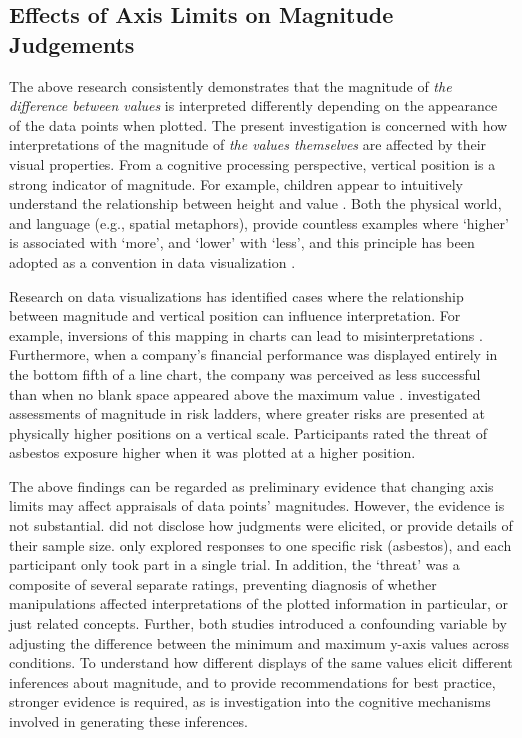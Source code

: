 \documentclass[journal]{vgtc}                %
\begin{document}
\hypertarget{effects-of-axis-limits-on-magnitude-judgements}{%
\subsection{Effects of Axis Limits on Magnitude Judgements}\label{effects-of-axis-limits-on-magnitude-judgements}}

The above research consistently demonstrates that the magnitude of \emph{the
difference between values} is interpreted differently depending on the
appearance of the data points when plotted. The present investigation is
concerned with how interpretations of the magnitude of \emph{the values
themselves} are affected by their visual properties. From a cognitive
processing perspective, vertical position is a strong indicator of
magnitude. For example, children appear to intuitively understand the
relationship between height and value \citep{gattis_structure_2002}. Both the
physical world, and language (e.g., spatial metaphors), provide
countless examples where `higher' is associated with `more', and `lower'
with `less', and this principle has been adopted as a convention in data
visualization \citep{tversky_cognitive_1997}.

Research on data visualizations has identified cases where the
relationship between magnitude and vertical position can influence
interpretation. For example, inversions of this mapping in charts can
lead to misinterpretations \citep{okan_when_2012, pandey_how_2015, woodin_conceptual_2022}. Furthermore, when a company's financial
performance was displayed entirely in the bottom fifth of a line chart,
the company was perceived as less successful than when no blank space
appeared above the maximum value \citep{taylor_misleading_1986}.
\citet{sandman_high_1994} investigated assessments of magnitude in risk
ladders, where greater risks are presented at physically higher
positions on a vertical scale. Participants rated the threat of asbestos
exposure higher when it was plotted at a higher position.~

The above findings can be regarded as preliminary evidence that changing
axis limits may affect appraisals of data points' magnitudes. However,
the evidence is not substantial. \citet{taylor_misleading_1986} did not
disclose how judgments were elicited, or provide details of their sample
size. \citet{sandman_high_1994} only explored responses to one specific risk
(asbestos), and each participant only took part in a single trial. In
addition, the `threat' was a composite of several separate ratings,
preventing diagnosis of whether manipulations affected interpretations
of the plotted information in particular, or just related concepts.
Further, both studies introduced a confounding variable by adjusting the
difference between the minimum and maximum y-axis values across
conditions. To understand how different displays of the same values
elicit different inferences about magnitude, and to provide
recommendations for best practice, stronger evidence is required, as is
investigation into the cognitive mechanisms involved in generating these
inferences.~
\end{document}
